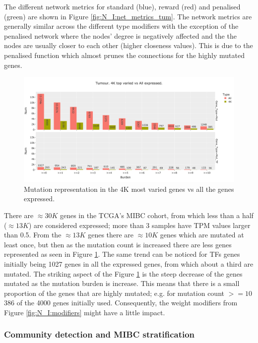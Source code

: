The different network metrics for standard (blue), reward (red) and penalised (green) are shown in Figure \ref{fig:N_I:net_metrics_tum}. The network metrics are generally similar across the different type modifiers with the exception of the penalised network where the nodes' degree is negatively affected and the the nodes are usually closer to each other (higher closeness values). This is due to the penalised function which almost prunes the connections for the highly mutated genes.

\begin{figure}[!htb]    \centering\includegraphics[width=1.0\textwidth,height=0.6\textheight,keepaspectratio]{Sections/Network_I/Resources/Tum_network/MutTF_representation_4K-all.png}
    \caption{Mutation representation in the 4K most varied genes vs all the genes expressed.}
    \label{fig:N_I:mut_rep_tum}
\end{figure}


There are $\approx30K$ genes in the TCGA's MIBC cohort, from which less than a half ($\approx13K$) are considered expressed; more than 3 samples have TPM values larger than 0.5. From the $\approx13K$ genes there are $\approx10K$ genes which are mutated at least once, but then as the mutation count is increased there are less genes represented as seen in Figure \ref{fig:N_I:mut_rep_tum}. The same trend can be noticed for TFs genes initially being 1027 genes in all the expressed genes, from which about a third are mutated. The striking aspect of the Figure \ref{fig:N_I:mut_rep_tum} is the steep decrease of the genes mutated as the mutation burden is increase. This means that there is a small proportion of the genes that are highly mutated; e.g. for mutation count $>=10$ 386 of the 4000 genes initially used. Consequently, the weight modifiers from Figure \ref{fig:N_I:modifiers} might have a little impact.


\subsubsection{Community detection and MIBC stratification} \label{s:N_I:tum_stratification}

